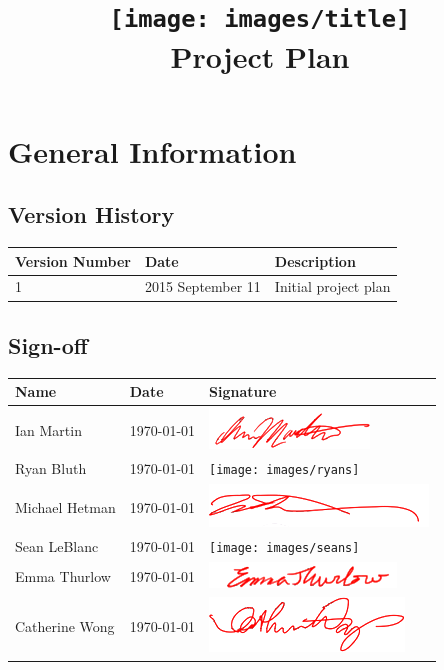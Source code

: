 \documentclass{GlobalDocument}
\title{\texttt{[image: images/title]}\\Project Plan}
\author{\ourteam}
\begin{document}
\BgUsetrue %

\maketitle

\chapter{General Information}

\section{Version History}
\begin{tabular}{| p{} | p{} | p{} |}
  \hline
  Version Number & Date & Description \\
  \hline
  1 & 2015 September 11 & Initial project plan\\
  \hline
\end{tabular}


\section{Sign-off}
\begin{tabular}{| m{} | m{} | m{} |}
  \hline
  Name & Date & Signature \\
  \hline
  Ian Martin & \today & \includegraphics{images/ians}\\ 
  \hline
  Ryan Bluth & \today & \texttt{[image: images/ryans]}\\
  \hline
  Michael Hetman & \today & \includegraphics{images/michaels}\\
  \hline
  Sean LeBlanc & \today & \texttt{[image: images/seans]}\\
  \hline
  Emma Thurlow & \today & \includegraphics{images/emmas}\\
  \hline
  Catherine Wong & \today & \includegraphics{images/cats}\\
  \hline
\end{tabular}
\end{document}
